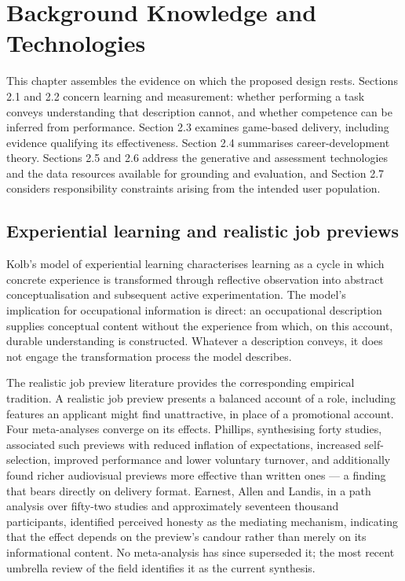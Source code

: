 \newpage
\section{Background Knowledge and Technologies}

This chapter assembles the evidence on which the proposed design rests. Sections 2.1 and 2.2 concern learning and measurement: whether performing a task conveys understanding that description cannot, and whether competence can be inferred from performance. Section 2.3 examines game-based delivery, including evidence qualifying its effectiveness. Section 2.4 summarises career-development theory. Sections 2.5 and 2.6 address the generative and assessment technologies and the data resources available for grounding and evaluation, and Section 2.7 considers responsibility constraints arising from the intended user population.

\subsection{Experiential learning and realistic job previews}

Kolb's model of experiential learning\cite{r12} characterises learning as a cycle in which concrete experience is transformed through reflective observation into abstract conceptualisation and subsequent active experimentation. The model's implication for occupational information is direct: an occupational description supplies conceptual content without the experience from which, on this account, durable understanding is constructed. Whatever a description conveys, it does not engage the transformation process the model describes.

The realistic job preview literature provides the corresponding empirical tradition\cite{r13}. A realistic job preview presents a balanced account of a role, including features an applicant might find unattractive, in place of a promotional account. Four meta-analyses converge on its effects\cite{r8,r9,r14,r15}. Phillips\cite{r8}, synthesising forty studies, associated such previews with reduced inflation of expectations, increased self-selection, improved performance and lower voluntary turnover, and additionally found richer audiovisual previews more effective than written ones --- a finding that bears directly on delivery format. Earnest, Allen and Landis\cite{r9}, in a path analysis over fifty-two studies and approximately seventeen thousand participants, identified perceived honesty as the mediating mechanism, indicating that the effect depends on the preview's candour rather than merely on its informational content. No meta-analysis has since superseded it; the most recent umbrella review of the field identifies it as the current synthesis\cite{r16}.

